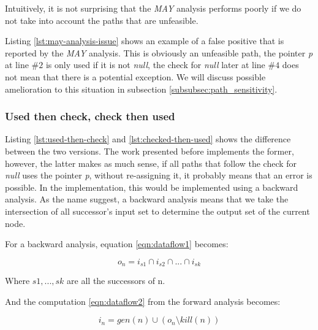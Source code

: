 Intuitively, it is not surprising that the \emph{MAY} analysis performs poorly if we do not take into account the paths that are unfeasible.



Listing \ref{lst:may-analysis-issue} shows an example of a false positive that is reported by the \emph{MAY} analysis. 
This is obviously an unfeasible path, the pointer \emph{p} at line $\#2$ is only used if it is not \emph{null}, the check for \emph{null} later at line $\#4$ does not mean that there is a potential exception.
We will discuss possible amelioration to this situation in subsection \ref{subsubsec:path_sensitivity}.

\subsubsection{Used then check, check then used}
\label{subsubsec:used_then_check_check_then_used}




Listing \ref{lst:used-then-check} and \ref{lst:checked-then-used} shows the difference between the two versions.
The work presented before implements the former, however, the latter makes as much sense, if all paths that follow the check for \emph{null} uses the pointer \emph{p}, without re-assigning it, it probably means that an error is possible.
In the implementation, this would be implemented using a backward analysis. 
As the name suggest, a backward analysis means that we take the intersection of all successor’s input set to determine the output set of the current node. 

For a backward analysis, equation \ref{eqn:dataflow1} becomes:

\begin{equation}\label{eqn:checkthenused1}
o_{n} = i_{s1}  \cap   i_{s2}  \cap  ... \cap   i_{sk}
\end{equation}

Where $s1, ..., sk$ are all the successors of n.

And the computation \ref{eqn:dataflow2} from the forward analysis becomes:

\begin{equation}\label{eqn:checkthenused2}
i_{n} = gen(n)  \cup   (o_{n} \setminus kill(n))
\end{equation}

